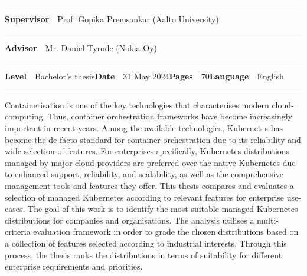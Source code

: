 \begin{spacing}{.88}
{\vspace{-2.4mm}\rule{\textwidth}{.75pt}

{\fontsize{10.5pt}{10.5pt}\bfseries\sffamily\lsstyle Supervisor}~~{\small Prof. Gopika Premsankar (Aalto University)}

\vspace{-2.4mm}\rule{\textwidth}{.75pt}

{\fontsize{10.5pt}{10.5pt}\bfseries\sffamily\lsstyle Advisor}~~{\small Mr. Daniel Tyrode (Nokia Oy)}

\vspace{-2.4mm}\rule{\textwidth}{.75pt}

{\fontsize{10.5pt}{10.5pt}\bfseries\sffamily\lsstyle Level}~~{\small Bachelor's thesis}\hfill{\fontsize{10.5pt}{10.5pt}\bfseries\sffamily\lsstyle Date}~~{\small 31 May 2024}\hfill{\fontsize{10.5pt}{10.5pt}\bfseries\sffamily\lsstyle Pages}~~{\small 70}\hfill{\fontsize{10.5pt}{10.5pt}\bfseries\sffamily\lsstyle Language}~~{\small English}

\vspace{-2.4mm}\rule{\textwidth}{.75pt}

\vspace{6mm}

} %
\end{spacing}
\begin{spacing}{1.05}

\vspace{.8mm}

{\small
  Containerisation is one of the key technologies that characterises modern cloud-computing. Thus, container orchestration frameworks have become increasingly important in recent years. Among the available technologies, Kubernetes has become the de facto standard for container orchestration due to its reliability and wide selection of features. For enterprises specifically, Kubernetes distributions managed by major cloud providers are preferred over the native Kubernetes due to enhanced support, reliability, and scalability, as well as the comprehensive management tools and features they offer. This thesis compares and evaluates a selection of managed Kubernetes according to relevant features for enterprise use-cases. The goal of this work is to identify the most suitable managed Kubernetes distributions for companies and organisations. The analysis utilises a multi-criteria evaluation framework in order to grade the chosen distributions based on a collection of features selected according to industrial interests. Through this process, the thesis ranks the distributions in terms of suitability for different enterprise requirements and priorities.
}

\vfill

\end{spacing}
